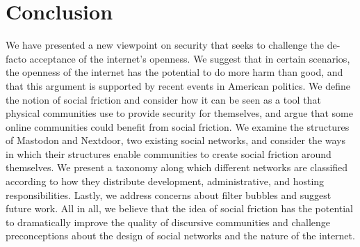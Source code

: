 \documentclass[sigconf,authordraft]{acmart}
\begin{document}
\section{Conclusion}

We have presented a new viewpoint on security that seeks to challenge the de-facto acceptance of the internet's openness. We suggest that in certain scenarios, the openness of the internet has the potential to do more harm than good, and that this argument is supported by recent events in American politics. We define the notion of social friction and consider how it can be seen as a tool that physical communities use to provide security for themselves, and argue that some online communities could benefit from social friction. We examine the structures of Mastodon and Nextdoor, two existing social networks, and consider the ways in which their structures enable communities to create social friction around themselves. We present a taxonomy along which different networks are classified according to how they distribute development, administrative, and hosting responsibilities. Lastly, we address concerns about filter bubbles and suggest future work. All in all, we believe that the idea of social friction has the potential to dramatically improve the quality of discursive communities and challenge preconceptions about the design of social networks and the nature of the internet. 





\end{document}
